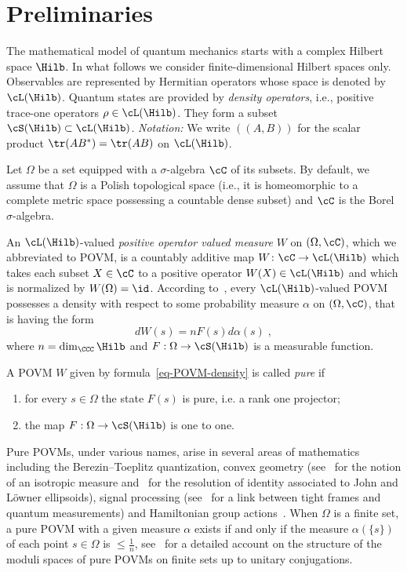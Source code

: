 \section{Preliminaries}\label{prel}
The mathematical model of quantum mechanics starts with a complex Hilbert space $\Hilb$. In what follows we consider finite-dimensional Hilbert spaces only. Observables are represented by Hermitian operators whose space is denoted by $\cL(\Hilb)$. Quantum states are provided by \emph{density operators}, i.e., positive trace-one operators $\rho \in \cL(\Hilb)$. They form a subset $\cS(\Hilb) \subset \cL(\Hilb)$.
\emph{Notation:} We write $((A,B))$ for the scalar product $\tr(AB^*)= \tr(AB)$ on $\cL(\Hilb)$.

Let $\Omega$ be a set equipped with a $\sigma$-algebra $\cC$ of its subsets. By default, we assume that $\Omega$ is a Polish topological space (i.e., it is homeomorphic to a complete metric space possessing a countable dense subset) and $\cC$ is the Borel $\sigma$-algebra.

An $\cL(\Hilb)$-valued \emph{positive operator valued measure} $W$ on $(\Omega,\cC)$, which we abbreviated to POVM, is a countably additive map $W\colon \cC \to \cL(\Hilb)$ which takes each subset $X \in \cC$ to a positive operator $W(X) \in \cL(\Hilb)$ and which is normalized by $W(\Omega) = \id$. According to~\cite{CDS}, every $\cL(\Hilb)$-valued POVM possesses a density with respect to some probability measure $\alpha$ on $(\Omega, \cC)$, that is having the form
\begin{equation}\label{eq-POVM-density}
dW(s) = nF(s) d\alpha(s)\;,
\end{equation}
where $n= \dim_{\CCC} \Hilb$ and $F: \Omega \to \cS(\Hilb)$ is a measurable function.

A POVM $W$ given by formula~\eqref{eq-POVM-density} is called \emph{pure} if
\begin{enumerate}\romanenumi
\item \label{list2.1}for every $s \in \Omega$ the state $F(s)$ is pure, i.e. a rank one projector;
\item \label{list2.2}the map $F:\Omega \to \cS(\Hilb)$ is one to one.
\end{enumerate}
Pure POVMs, under various names, arise in several areas of mathematics including the Berezin--Toeplitz quantization, convex geometry (see~\cite{GM} for the notion of an isotropic measure and~\cite{AS} for the resolution of identity associated to John and L\"owner ellipsoids), signal processing (see~\cite{EF} for a link between tight frames and quantum measurements) and Hamiltonian group actions~\cite{FM}. When $\Omega$ is a finite set, a pure POVM with a given measure $\alpha$ exists if and only if the measure $\alpha(\{s\})$ of each point $s \in \Omega$ is $\leq \frac{1}{n}$, see~\cite{FM} for a detailed account on the structure of the moduli spaces of pure POVMs on finite sets up to unitary conjugations.

